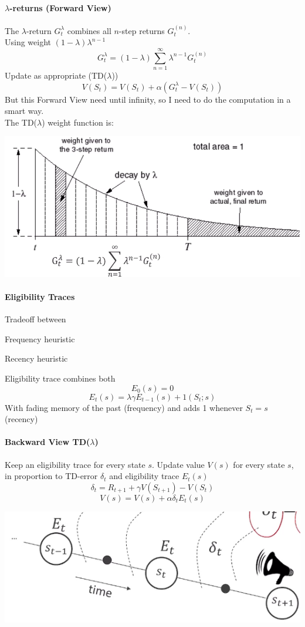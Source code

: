 \documentclass[10pt]{report}
\begin{document}
\paragraph{$\lambda$-returns (Forward View)} The $\lambda$-return $G_t^\lambda$ combines all $n$-step returns $G_t^{(n)}$.\\
Using weight $(1-\lambda)\lambda^{n-1}$
$$G_t^\lambda = (1-\lambda)\sum_{n=1}^\infty \lambda^{n-1}G_t^{(n)}$$
Update as appropriate (TD($\lambda$))
$$V(S_t) = V(S_t) + \alpha\left(G_t^\lambda - V(S_t)\right)$$
But this Forward View need until infinity, so I need to do the computation in a smart way.\\
The TD($\lambda$) weight function is:
\begin{center}
	\includegraphics[scale=0.5]{170.png}
\end{center}
\paragraph{Eligibility Traces} Tradeoff between
\begin{list}{}{}
	\item Frequency heuristic
	\item Recency heuristic
\end{list}
Eligibility trace combines both
$$E_0(s) = 0$$
$$E_t(s) = \lambda\gamma E_{t-1}(s) + 1(S_t;s)$$
With fading memory of the past (frequency) and adds 1 whenever $S_t = s$ (recency)
\paragraph{Backward View TD($\lambda$)} Keep an eligibility trace for every state $s$. Update value $V(s)$ for every state $s$, in proportion to TD-error $\delta_t$ and eligibility trace $E_t(s)$
$$\delta_t = R_{t+1} + \gamma V(S_{t+1}) - V(S_t)$$
$$V(s) = V(s) + \alpha\delta_t E_t(s)$$
\begin{center}
	\includegraphics[scale=0.5]{171.png}
\end{center}
\end{document}

